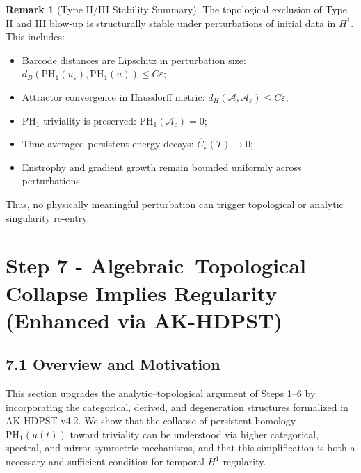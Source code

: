 \documentclass[11pt]{article}
\theoremstyle{definition}
\newtheorem{remark}[theorem]{Remark}
\begin{document}
\begin{remark}[Type II/III Stability Summary]
The topological exclusion of Type II and III blow-up is structurally stable under perturbations of initial data in $H^1$. This includes:
\begin{itemize}
    \item Barcode distances are Lipschitz in perturbation size: $d_B(\mathrm{PH}_1(u_\varepsilon), \mathrm{PH}_1(u)) \le C \varepsilon$;
    \item Attractor convergence in Hausdorff metric: $d_H(\mathcal{A}, \mathcal{A}_\varepsilon) \le C \varepsilon$;
    \item PH$_1$-triviality is preserved: $\mathrm{PH}_1(\mathcal{A}_\varepsilon) = 0$;
    \item Time-averaged persistent energy decays: $\overline{C}_\varepsilon(T) \to 0$;
    \item Enstrophy and gradient growth remain bounded uniformly across perturbations.
\end{itemize}
Thus, no physically meaningful perturbation can trigger topological or analytic singularity re-entry.
\end{remark}



\section{Step 7 - Algebraic--Topological Collapse Implies Regularity (Enhanced via AK-HDPST)}

\subsection*{7.1 Overview and Motivation}

This section upgrades the analytic--topological argument of Steps 1--6 by incorporating the categorical, derived, and degeneration structures formalized in AK-HDPST v4.2. We show that the collapse of persistent homology $\mathrm{PH}_1(u(t))$ toward triviality can be understood via higher categorical, spectral, and mirror-symmetric mechanisms, and that this simplification is both a necessary and sufficient condition for temporal $H^1$-regularity.
\end{document}
